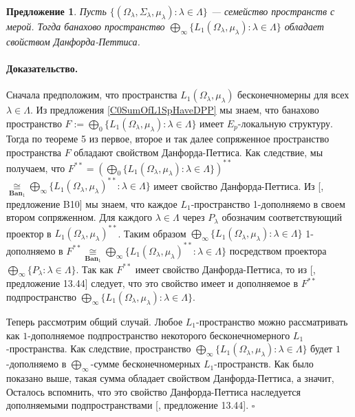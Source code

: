 \documentclass[12pt]{article}
\newcommand{\isom}[1]{\mathop{\mathbin{\cong}}\limits_{#1}}
\newtheorem{proposition}[theorem]{Предложение}
\renewenvironment{proof}{\paragraph{Доказательство.}}{\hfill$\square$\medskip}
\begin{document}
\begin{proposition}\label{ProdOfL1SpHaveDPP} Пусть $\{(\Omega_\lambda,\Sigma_\lambda,\mu_\lambda):\lambda\in\Lambda\}$ --- семейство пространств с мерой. Тогда банахово пространство $\bigoplus_\infty\{L_1(\Omega_\lambda,\mu_\lambda):\lambda\in\Lambda\}$ обладает свойством Данфорда-Петтиса.
\end{proposition}
\begin{proof} Сначала предположим, что пространства $L_1(\Omega_\lambda, \mu_\lambda)$ бесконечномерны для всех $\lambda\in\Lambda$. Из предложения \ref{C0SumOfL1SpHaveDPP} мы знаем, что банахово пространство $F:=\bigoplus_0\{L_1(\Omega_\lambda,\mu_\lambda):\lambda\in\Lambda\}$ имеет $E_{p}$-локальную структуру. Тогда по теореме 5 из \cite{BourgOnTheDPP} первое, второе и так далее сопряженное пространство пространства $F$ обладают свойством Данфорда-Петтиса. Как следствие, мы получаем, что $F^{**}=\left(\bigoplus_0\{L_1(\Omega_\lambda,\mu_\lambda):\lambda\in\Lambda\}\right)^{**}$ $\isom{\mathbf{Ban}_1}\bigoplus_\infty\{L_1(\Omega_\lambda,\mu_\lambda)^{**}:\lambda\in\Lambda\}$ имеет свойство Данфорда-Петтиса. Из [\cite{DefFloTensNorOpId}, предложение B10] мы знаем, что каждое $L_1$-пространство 1-дополняемо в своем втором сопряженном. Для каждого $\lambda\in\Lambda$ через $P_\lambda$ обозначим соответствующий проектор в $L_1(\Omega_\lambda,\mu_\lambda)^{**}$. Таким образом $\bigoplus_\infty\{L_1(\Omega_\lambda,\mu_\lambda):\lambda\in\Lambda\}$ 1-дополняемо в $F^{**}\isom{\mathbf{Ban}_1}\bigoplus_\infty\{L_1(\Omega_\lambda,\mu_\lambda)^{**}:\lambda\in\Lambda\}$ посредством проектора $\bigoplus_\infty \{P_\lambda:\lambda\in\Lambda\}$. Так как $F^{**}$ имеет свойство Данфорда-Петтиса, то из [\cite{FabHabBanSpTh}, предложение 13.44] следует, что это свойство имеет и дополняемое в $F^{**}$ подпространство $\bigoplus_\infty\{L_1(\Omega_\lambda,\mu_\lambda):\lambda\in\Lambda\}$.

Теперь рассмотрим общий случай. Любое $L_1$-пространство можно рассматривать как $1$-дополняемое подпространство некоторого бесконечномерного $L_1$-пространства. Как следствие, пространство $\bigoplus_\infty\{L_1(\Omega_\lambda,\mu_\lambda):\lambda\in\Lambda\}$ будет $1$-дополняемо в $\bigoplus_\infty$-сумме бесконечномерных $L_1$-пространств. Как было показано выше, такая сумма обладает свойством Данфорда-Петтиса, а значит,  Осталось вспомнить, что это свойство Данфорда-Петтиса наследуется дополняемыми подпространствами [\cite{FabHabBanSpTh}, предложение 13.44].
\end{proof}
\end{document}
